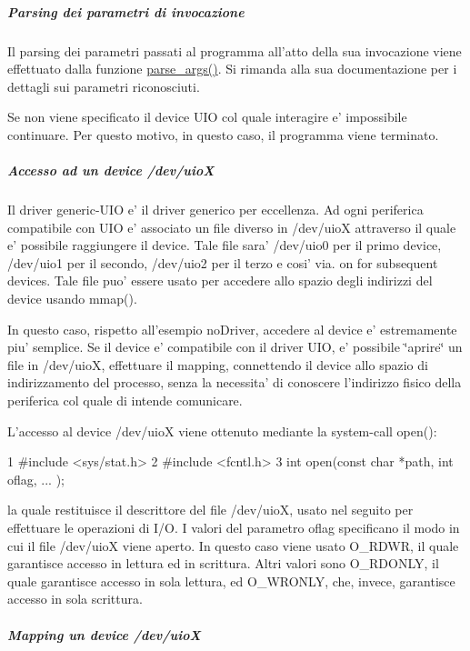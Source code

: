 \subparagraph*{Parsing dei parametri di invocazione}

Il parsing dei parametri passati al programma all'atto della sua invocazione viene effettuato dalla funzione \hyperlink{group___u_i_o-interrupt_gab6b18eb1bf7bc996599c06dc6dad8f53}{parse\+\_\+args()}. Si rimanda alla sua documentazione per i dettagli sui parametri riconosciuti.

Se non viene specificato il device U\+I\+O col quale interagire e' impossibile continuare. Per questo motivo, in questo caso, il programma viene terminato.

\subparagraph*{Accesso ad un device /dev/uio\+X}

Il driver generic-\/\+U\+I\+O e' il driver generico per eccellenza. Ad ogni periferica compatibile con U\+I\+O e' associato un file diverso in /dev/uio\+X attraverso il quale e' possibile raggiungere il device. Tale file sara' /dev/uio0 per il primo device, /dev/uio1 per il secondo, /dev/uio2 per il terzo e cosi' via. on for subsequent devices. Tale file puo' essere usato per accedere allo spazio degli indirizzi del device usando mmap().

In questo caso, rispetto all'esempio no\+Driver, accedere al device e' estremamente piu' semplice. Se il device e' compatibile con il driver U\+I\+O, e' possibile \char`\"{}aprire\char`\"{} un file in /dev/uio\+X, effettuare il mapping, connettendo il device allo spazio di indirizzamento del processo, senza la necessita' di conoscere l'indirizzo fisico della periferica col quale di intende comunicare.

L'accesso al device /dev/uio\+X viene ottenuto mediante la system-\/call open()\+: 
\begin{DoxyCode}
1 #include <sys/stat.h>
2 #include <fcntl.h>
3 int open(const char *path, int oflag, ...  );
\end{DoxyCode}
 la quale restituisce il descrittore del file /dev/uio\+X, usato nel seguito per effettuare le operazioni di I/\+O. I valori del parametro oflag specificano il modo in cui il file /dev/uio\+X viene aperto. In questo caso viene usato O\+\_\+\+R\+D\+W\+R, il quale garantisce accesso in lettura ed in scrittura. Altri valori sono O\+\_\+\+R\+D\+O\+N\+L\+Y, il quale garantisce accesso in sola lettura, ed O\+\_\+\+W\+R\+O\+N\+L\+Y, che, invece, garantisce accesso in sola scrittura.

\subparagraph*{Mapping un device /dev/uio\+X}

